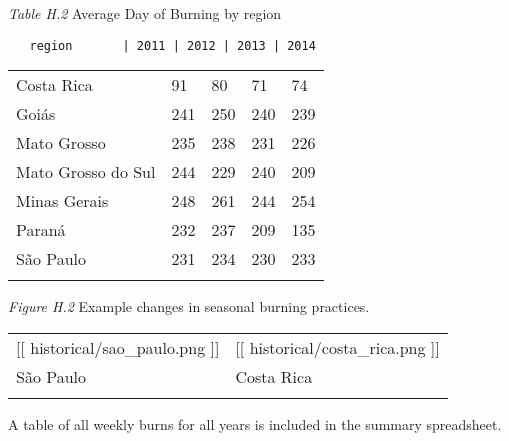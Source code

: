 \documentclass[]{article}
\begin{document}
\emph{Table H.2} Average Day of Burning by region

\begin{verbatim}
   region       | 2011 | 2012 | 2013 | 2014 
\end{verbatim}

\begin{longtable}[c]{@{}lllll@{}}
\toprule\addlinespace
Costa Rica & 91 & 80 & 71 & 74
\\\addlinespace
Goiás & 241 & 250 & 240 & 239
\\\addlinespace
Mato Grosso & 235 & 238 & 231 & 226
\\\addlinespace
Mato Grosso do Sul & 244 & 229 & 240 & 209
\\\addlinespace
Minas Gerais & 248 & 261 & 244 & 254
\\\addlinespace
Paraná & 232 & 237 & 209 & 135
\\\addlinespace
São Paulo & 231 & 234 & 230 & 233
\\\addlinespace
\bottomrule
\end{longtable}

\emph{Figure H.2} Example changes in seasonal burning practices.

\begin{longtable}[c]{@{}ll@{}}
\toprule\addlinespace
{[}{[} historical/sao\_paulo.png {]}{]} & {[}{[}
historical/costa\_rica.png {]}{]}
\\\addlinespace
\midrule\endhead
São Paulo & Costa Rica
\\\addlinespace
\bottomrule
\end{longtable}

A table of all weekly burns for all years is included in the summary
spreadsheet.
\end{document}
